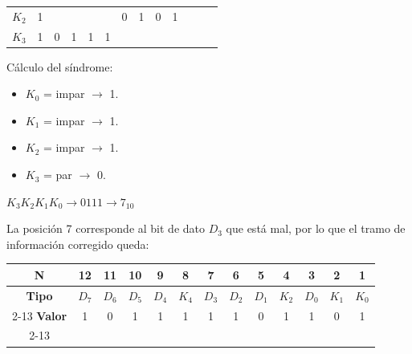 \begin{center}
\begin{tabular}{ccccccccccccc}
\cellcolor[HTML]{9AFF99}$K_2$          & \cellcolor[HTML]{96FFFB}1 &                           &                           &                           &                           & \cellcolor[HTML]{96FFFB}0 & \cellcolor[HTML]{96FFFB}1 & \cellcolor[HTML]{96FFFB}0 & \cellcolor[HTML]{96FFFB}1 &                           &                           &                           \\
\cellcolor[HTML]{9AFF99}$K_3$          & \cellcolor[HTML]{96FFFB}1 & \cellcolor[HTML]{96FFFB}0 & \cellcolor[HTML]{96FFFB}1 & \cellcolor[HTML]{96FFFB}1 & \cellcolor[HTML]{96FFFB}1 &                           &                           &                           &                           &                           &                           &                          
\end{tabular}
\end{center}
\noindent{}Cálculo del síndrome:
\begin{itemize}[nosep]
    \item $K_0$ = impar $\rightarrow$ 1.
    \item $K_1$ = impar $\rightarrow$ 1. 
    \item $K_2$ = impar $\rightarrow$ 1.
    \item $K_3$ = par $\rightarrow$ 0.
\end{itemize}
\begin{center}\Large
    $K_3 K_2 K_1 K_0 \rightarrow 0111 \rightarrow 7_{10}$
\end{center}
\sangria{} La posición 7 corresponde al bit de dato $D_3$ que está mal, por lo que el tramo de información corregido queda:
\begin{center}
\begin{tabular}{ccccccccccccc}
\rowcolor[HTML]{FFFFC7} 
\cellcolor[HTML]{FCFF2F}\textbf{N}     & 12    & 11    & 10    & 9     & 8     & 7     & 6     & 5     & 4     & 3     & 2     & 1     \\ \hline
\rowcolor[HTML]{CBCEFB} 
\cellcolor[HTML]{9698ED}\textbf{Tipo}  & $D_7$ & $D_6$ & $D_5$ & $D_4$ & $K_4$ & $D_3$ & $D_2$ & $D_1$ & $K_2$ & $D_0$ & $K_1$ & $K_0$ \\ \cline{2-13} 
\rowcolor[HTML]{FFCCC9} 
\cellcolor[HTML]{FD6864}\textbf{Valor} & 1     & 0     & 1     & 1     & 1     & 1     & 1     & 0     & 1     & 1     & 0     & 1     \\ \cline{2-13} 
\end{tabular}
\end{center}
